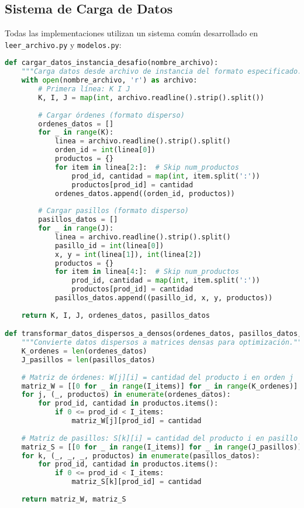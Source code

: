 \documentclass[a4paper,12pt]{article}
\begin{document}
\subsection{Sistema de Carga de Datos}

Todas las implementaciones utilizan un sistema común desarrollado en \texttt{leer\_archivo.py} y \texttt{modelos.py}:

\begin{lstlisting}[language=Python, caption=Sistema de carga de datos]
def cargar_datos_instancia_desafio(nombre_archivo):
    """Carga datos desde archivo de instancia del formato especificado."""
    with open(nombre_archivo, 'r') as archivo:
        # Primera línea: K I J
        K, I, J = map(int, archivo.readline().strip().split())
        
        # Cargar órdenes (formato disperso)
        ordenes_datos = []
        for _ in range(K):
            linea = archivo.readline().strip().split()
            orden_id = int(linea[0])
            productos = {}
            for item in linea[2:]:  # Skip num_productos
                prod_id, cantidad = map(int, item.split(':'))
                productos[prod_id] = cantidad
            ordenes_datos.append((orden_id, productos))
        
        # Cargar pasillos (formato disperso)
        pasillos_datos = []
        for _ in range(J):
            linea = archivo.readline().strip().split()
            pasillo_id = int(linea[0])
            x, y = int(linea[1]), int(linea[2])
            productos = {}
            for item in linea[4:]:  # Skip num_productos
                prod_id, cantidad = map(int, item.split(':'))
                productos[prod_id] = cantidad
            pasillos_datos.append((pasillo_id, x, y, productos))
    
    return K, I, J, ordenes_datos, pasillos_datos

def transformar_datos_dispersos_a_densos(ordenes_datos, pasillos_datos, I_items):
    """Convierte datos dispersos a matrices densas para optimización."""
    K_ordenes = len(ordenes_datos)
    J_pasillos = len(pasillos_datos)
    
    # Matriz de órdenes: W[j][i] = cantidad del producto i en orden j
    matriz_W = [[0 for _ in range(I_items)] for _ in range(K_ordenes)]
    for j, (_, productos) in enumerate(ordenes_datos):
        for prod_id, cantidad in productos.items():
            if 0 <= prod_id < I_items:
                matriz_W[j][prod_id] = cantidad
    
    # Matriz de pasillos: S[k][i] = cantidad del producto i en pasillo k
    matriz_S = [[0 for _ in range(I_items)] for _ in range(J_pasillos)]
    for k, (_, _, _, productos) in enumerate(pasillos_datos):
        for prod_id, cantidad in productos.items():
            if 0 <= prod_id < I_items:
                matriz_S[k][prod_id] = cantidad
    
    return matriz_W, matriz_S
\end{lstlisting}
\end{document}
